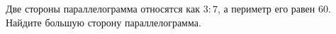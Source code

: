 \begin{ex}
	\begin{condition}
		Две стороны параллелограмма относятся как \(3:7\), а периметр его равен \( 60 \). Найдите большую сторону параллелограмма.
	\end{condition}
\end{ex}